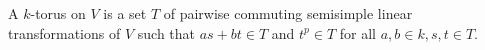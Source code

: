 A $k$-torus on $V$ is a set $T$ of pairwise commuting semisimple linear transformations of $V$ such that $as + bt \in T$ and $t^p \in T$ for all $a, b \in k, s, t \in T$.
